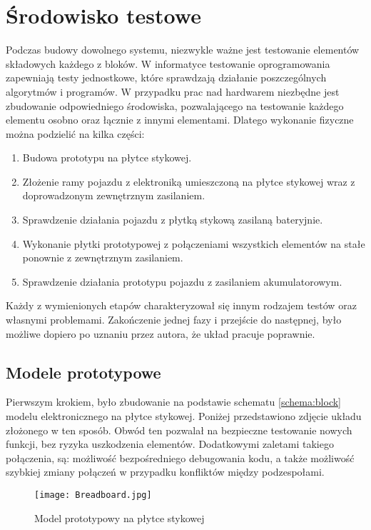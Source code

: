 \section{Środowisko testowe}
\label{sec:testing}
    Podczas budowy dowolnego systemu, niezwykle ważne jest testowanie elementów składowych każdego z bloków.
    W informatyce testowanie oprogramowania zapewniają testy jednostkowe, które sprawdzają działanie poszczególnych algorytmów i programów.
    W przypadku prac nad hardwarem niezbędne jest zbudowanie odpowiedniego środowiska, pozwalającego na testowanie każdego elementu osobno oraz łącznie z innymi elementami.
    Dlatego wykonanie fizyczne można podzielić na kilka części:
    \begin{enumerate}
        \item Budowa prototypu na płytce stykowej.
        \item Złożenie ramy pojazdu z elektroniką umieszczoną na płytce stykowej wraz z doprowadzonym zewnętrznym zasilaniem.
        \item Sprawdzenie działania pojazdu z płytką stykową zasilaną bateryjnie.
        \item Wykonanie płytki prototypowej z połączeniami wszystkich elementów na stałe ponownie z zewnętrznym zasilaniem.
        \item Sprawdzenie działania prototypu pojazdu z zasilaniem akumulatorowym.
    \end{enumerate}
    Każdy z wymienionych etapów charakteryzował się innym rodzajem testów oraz własnymi problemami.
    Zakończenie jednej fazy i przejście do następnej, było możliwe dopiero po uznaniu przez autora, że układ pracuje poprawnie.

    \subsection{Modele prototypowe}
        Pierwszym krokiem, było zbudowanie na podstawie schematu \ref{schema:block} modelu elektronicznego na płytce stykowej.
        Poniżej przedstawiono zdjęcie układu złożonego w ten sposób.
        Obwód ten pozwalał na bezpieczne testowanie nowych funkcji, bez ryzyka uszkodzenia elementów.
        Dodatkowymi zaletami takiego połączenia, są: możliwość bezpośredniego debugowania kodu, a także możliwość szybkiej zmiany połączeń w przypadku konfliktów między podzespołami.
        \begin{figure}[!ht]
            \centering
            \texttt{[image: Breadboard.jpg]}
            \caption{Model prototypowy na płytce stykowej}
            \label{fig:breadboard}
        \end{figure}

